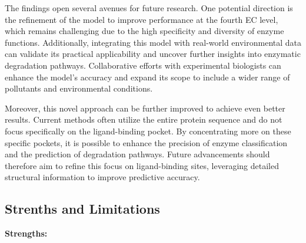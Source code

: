 The findings open several avenues for future research. One potential direction is the refinement of the model to improve performance at the fourth EC level, which remains challenging due to the high specificity and diversity of enzyme functions. Additionally, integrating this model with real-world environmental data can validate its practical applicability and uncover further insights into enzymatic degradation pathways. Collaborative efforts with experimental biologists can enhance the model's accuracy and expand its scope to include a wider range of pollutants and environmental conditions.

Moreover, this novel approach can be further improved to achieve even better results. Current methods often utilize the entire protein sequence and do not focus specifically on the ligand-binding pocket. By concentrating more on these specific pockets, it is possible to enhance the precision of enzyme classification and the prediction of degradation pathways. Future advancements should therefore aim to refine this focus on ligand-binding sites, leveraging detailed structural information to improve predictive accuracy.


\subsection{Strenths and Limitations}
\label{sec:Strenths and Limitations}

\textbf{Strengths:}

